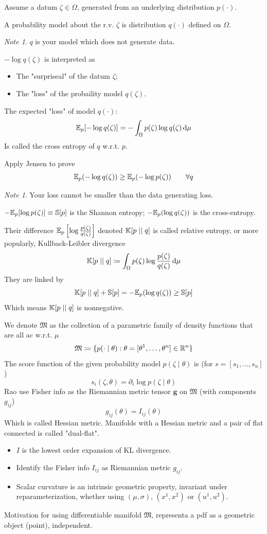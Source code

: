 \documentclass{amsart}
\let\originalmathbb\mathbb
\renewcommand{\mathbb}[1]{%
    \ifstrequal{#1}{1}{\mathbbm{#1}}{\originalmathbb{#1}}%
}
\theoremstyle{plain}
\theoremstyle{definition}
\theoremstyle{remark}
\newtheorem{note}[theorem]{Note}
\begin{document}
Assume a datum $\zeta\in \Omega$, generated from an underlying distribution $p(\cdot )$.

A probability model about the r.v. $\zeta$ is distribution $q(\cdot)$ defined on $\Omega$.

\begin{note}
$q$ is your model which does not generate data.
\end{note}
$-\log q(\zeta)$ is interpreted as

\begin{itemize}
	\item The "surpriseal" of the datum $\zeta$;
	\item The "loss" of the probaility model $q(\zeta)$.
\end{itemize}

The expected "loss" of model $q(\cdot)$:
\[
\mathbb{E}_{p}[-\log q(\zeta)]=-\int_{\Omega}^{} p(\zeta  )\log q(\zeta)\, \mathrm{d}\mu
\]
Is called the cross entropy of $q$ w.r.t. $p$.

Apply Jensen to prove
\[
\mathbb{E}_{p}(-\log q(\zeta))\geq \mathbb{E}_{p}(-\log p(\zeta))\qquad \forall q
\]
\begin{note}
Your loss cannot be smaller than the data generating loss.
\end{note}
$-\mathbb{E}_{p}[\log p(\zeta)]\equiv \mathbb{S}[p]$ is the Shannon entropy; $-\mathbb{E}_{p}(\log q (\zeta))$ is the cross-entropy.

Their difference $\mathbb{E}_{p}\left[ \log\frac{p(\zeta)}{q(\zeta)} \right]$ denoted $\mathbb{K}[p\mid \mid q]$ is called relative entropy, or more popularly, Kullback-Leibler divergence
\[
\mathbb{K}[p\mid \mid q]\coloneqq \int_{\Omega}^{} p(\zeta )\log\frac{p(\zeta)}{q(\zeta)} \, \mathrm{d}\mu
\]
They are linked by
\[
\mathbb{K}[p\mid \mid q]+\mathbb{S}[p]=-\mathbb{E}_{p}(\log q(\zeta))\geq \mathbb{S}[p]
\]
Which means $\mathbb{K}[p\mid \mid q]$ is nonnegative.


We denote $\mathfrak{M}$ as the collection of a parametric family of density functions that are all ac w.r.t. $\mu$
\[
\mathfrak{M}\coloneqq \{ p(\cdot \mid \theta):\theta=[\theta^{1},\dots,\theta^{n}]\in \mathbb{R}^{n} \}
\]
The score function of the given probability model $p(\zeta \mid\theta)$ is (for $s=[s_1,\dots,s_n]$)
\[
s_i(\zeta ,\theta)=\partial _i\log p(\zeta \mid \theta)
\]
Rao use Fisher info as the Riemannian metric tensor $\mathbf{g}$ on $\mathfrak{M}$ (with components $g_{ij}$)
\[
g_{ij}(\theta)=I_{ij}(\theta)
\]
Which is called Hessian metric. Manifolds with a Hessian metric and a pair of flat connected is called "dual-flat".

\begin{itemize}
	\item $I$ is the lowest order expansion of KL divergence.
	\item Identify the Fisher info $I_{ij}$ as Riemannian metric $g_{ij}$.
	\item Scalar curvature is an intrinsic geometric property, invariant under reparameterization, whether using $(\mu,\sigma)$, $(x^{1},x^{2})$ or $(u^{1},u^{2})$.
\end{itemize}

Motivation for using differentiable manifold $\mathfrak{M}$, representa a pdf as a geometric object (point), independent.
\end{document}
